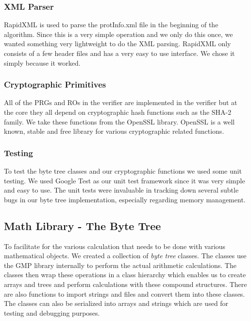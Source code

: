 \subsubsection{XML Parser}

RapidXML is used to parse the protInfo.xml file in the beginning of the algorithm. Since this is a very simple operation and we only do this once, we wanted something very lightweight to do the XML parsing. RapidXML only consists of a few header files and has a very easy to use interface. We chose it simply because it worked.

\subsubsection{Cryptographic Primitives}

All of the PRGs and ROs in the verifier are implemented in the verifier but at the core they all depend on cryptographic hash functions such as the SHA-2 family. We take these functions from the OpenSSL library. OpenSSL is a well known, stable and free library for various cryptographic related functions.

\subsubsection{Testing}

To test the byte tree classes and our cryptographic functions we used some unit testing. We used Google Test as our unit test framework since it was very simple and easy to use. The unit tests were invaluable in tracking down several subtle bugs in our byte tree implementation, especially regarding memory management.

\subsection{Math Library - The Byte Tree}

To facilitate for the various calculation that needs to be done with various mathematical objects. We created a collection of \emph{byte tree} classes. The classes use the GMP library internally to perform the actual arithmetic calculations. The classes then wrap these operations in a class hierarchy which enables us to create arrays and trees and perform calculations with these compound structures. There are also functions to import strings and files and convert them into these classes. The classes can also be serialized into arrays and strings which are used for testing and debugging purposes.


